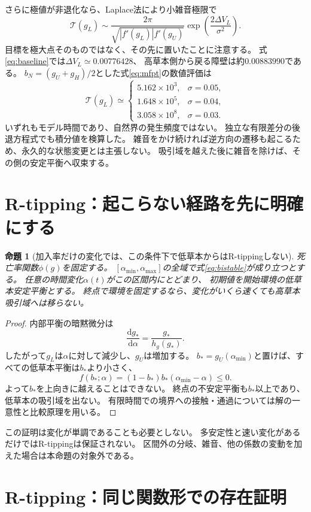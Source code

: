 \documentclass[a4paper,11pt]{ltjsarticle}
\newtheorem{proposition}{命題}
\newcommand{\dd}{\mathrm d}
\begin{document}
さらに極値が非退化なら、Laplace法により小雑音極限で
\begin{equation}
 \mathcal T(g_L)\sim
 \frac{2\pi}{\sqrt{|f'(g_L)|f'(g_U)}}
 \exp\left(\frac{2\Delta V_L}{\sigma^2}\right).
\end{equation}
目標を極大点そのものではなく、その先に置いたことに注意する。
式\eqref{eq:baseline}では$\Delta V_L\simeq0.00776428$、
高草本側から戻る障壁は約$0.00883990$である。
$b_N=(g_U+g_H)/2$とした式\eqref{eq:mfpt}の数値評価は
\[
 \mathcal T(g_L)\simeq
 \begin{cases}
 5.162\times10^3,&\sigma=0.05,\\
 1.648\times10^5,&\sigma=0.04,\\
 3.058\times10^8,&\sigma=0.03.
 \end{cases}
\]
いずれもモデル時間であり、自然界の発生頻度ではない。
独立な有限差分の後退方程式でも積分値を検算した。
雑音をかけ続ければ逆方向の遷移も起こるため、永久的な状態変更とは主張しない。
吸引域を越えた後に雑音を除けば、その側の安定平衡へ収束する。

\section{R-tipping：起こらない経路を先に明確にする}
\begin{proposition}[加入率だけの変化では、この条件下で低草本からはR-tippingしない]
死亡率関数$\phi(g)$を固定する。
$[\alpha_{\min},\alpha_{\max}]$の全域で式\eqref{eq:bistable}が成り立つとする。
任意の時間変化$\alpha(t)$がこの区間内にとどまり、
初期値を開始環境の低草本安定平衡とする。
終点で環境を固定するなら、変化がいくら速くても高草本吸引域へは移らない。
\end{proposition}
\begin{proof}
内部平衡の暗黙微分は
\[
 \frac{\dd g_*}{\dd\alpha}=\frac{g_*}{h_g(g_*)}.
\]
したがって$g_L$は$\alpha$に対して減少し、$g_U$は増加する。
$b_*=g_U(\alpha_{\min})$と置けば、すべての低草本平衡は$b_*$より小さく、
\[
 f(b_*;\alpha)=(1-b_*)b_*(\alpha_{\min}-\alpha)\le0.
\]
よって$b_*$を上向きに越えることはできない。
終点の不安定平衡も$b_*$以上であり、低草本の吸引域を出ない。
有限時間での境界への接触・通過については解の一意性と比較原理を用いる。
\end{proof}
この証明は変化が単調であることも必要としない。
多安定性と速い変化があるだけではR-tippingは保証されない。
区間外の分岐、雑音、他の係数の変動を加えた場合は本命題の対象外である。

\section{R-tipping：同じ関数形での存在証明}
\end{document}
